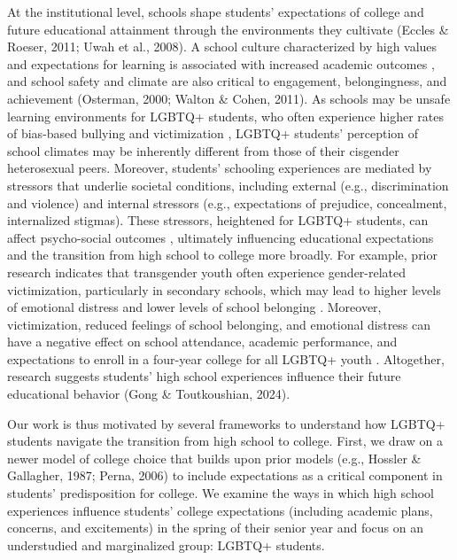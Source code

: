 At the institutional level, schools shape students' expectations of
college and future educational attainment through the environments they
cultivate (Eccles \& Roeser, 2011; Uwah et al., 2008). A school culture
characterized by high values and expectations for learning is associated
with increased academic outcomes \citep{hattie2009a}, and school safety and
climate are also critical to engagement, belongingness, and achievement
(Osterman, 2000; Walton \& Cohen, 2011). As schools may be unsafe
learning environments for LGBTQ+ students, who often experience higher
rates of bias-based bullying and victimization \citep{day2018a},
LGBTQ+ students' perception of school climates may be inherently
different from those of their cisgender heterosexual peers. Moreover,
students' schooling experiences are mediated by stressors that underlie
societal conditions, including external (e.g., discrimination and
violence) and internal stressors (e.g., expectations of prejudice,
concealment, internalized stigmas). These stressors, heightened for
LGBTQ+ students, can affect psycho-social outcomes \citep{hunter2021a}, ultimately influencing educational expectations and the
transition from high school to college more broadly. For example, prior
research indicates that transgender youth often experience
gender-related victimization, particularly in secondary schools, which
may lead to higher levels of emotional distress and lower levels of
school belonging \citep{mcbride2021a}. Moreover, victimization, reduced
feelings of school belonging, and emotional distress can have a negative
effect on school attendance, academic performance, and expectations to
enroll in a four-year college for all LGBTQ+ youth \citep{aragon2014a}. Altogether, research suggests students' high school experiences
influence their future educational behavior (Gong \& Toutkoushian, 2024).

Our work is thus motivated by several frameworks to understand how
LGBTQ+ students navigate the transition from high school to college.
First, we draw on a newer model of college choice \citep{klasik2025a}
that builds upon prior models (e.g., Hossler \& Gallagher, 1987; Perna,
2006) to include expectations as a critical component in students'
predisposition for college. We examine the ways in which high school
experiences influence students' college expectations (including academic
plans, concerns, and excitements) in the spring of their senior year and
focus on an understudied and marginalized group: LGBTQ+ students.

